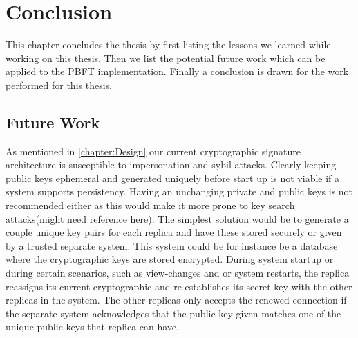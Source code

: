 \chapter{Conclusion}
\label{chapter:Con}
This chapter concludes the thesis by first listing the lessons we learned while working on this thesis. Then we list the potential future work which can be applied to the PBFT implementation.
Finally a conclusion is drawn for the work performed for this thesis.



\section{Future Work}
As mentioned in \autoref{chapter:Design} our current cryptographic signature architecture is susceptible to impersonation  and sybil attacks. Clearly keeping public keys ephemeral and generated uniquely before start up is not viable if a system supports persistency. Having an unchanging private and public keys is not recommended either as this would make it more prone to key search attacks(might need reference here). The simplest solution would be to generate a couple unique key pairs for each replica and have these stored securely or given by a trusted separate system. This system could be for instance be a database where the cryptographic keys are stored encrypted. During system startup or during certain scenarios, such as view-changes and or system restarts, the replica reassigns its current cryptographic and re-establishes its secret key with the other replicas in the system. The other replicas only accepts the renewed connection if the separate system acknowledges that the public key given matches one of the unique public keys that replica can have.

